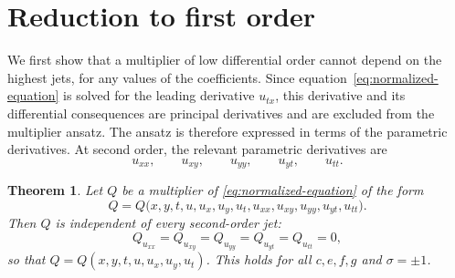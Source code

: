 \documentclass[11pt]{article}
\numberwithin{equation}{section}
\newtheorem{theorem}{Theorem}[section]
\theoremstyle{definition}
\theoremstyle{remark}
\begin{document}
\section{Reduction to first order}
\label{sec:order-reduction}

We first show that a multiplier of low differential order cannot
depend on the highest jets, for any values of the coefficients.
Since equation~\eqref{eq:normalized-equation} is solved for the
leading derivative $u_{tx}$, this derivative and its differential
consequences are principal derivatives and are excluded from the
multiplier ansatz. The ansatz is therefore expressed in terms of the
parametric derivatives. At second order, the relevant parametric
derivatives are
\[
u_{xx},
\qquad
u_{xy},
\qquad
u_{yy},
\qquad
u_{yt},
\qquad
u_{tt}.
\]

\begin{theorem}
\label{thm:order-reduction}
Let $Q$ be a multiplier of \eqref{eq:normalized-equation} of the form
\begin{equation}
Q = Q\bigl(x,y,t,u,u_x,u_y,u_t,
u_{xx},u_{xy},u_{yy},u_{yt},u_{tt}\bigr).
\label{eq:second-order-ansatz}
\end{equation}
Then $Q$ is independent of every second-order jet:
\begin{equation}
Q_{u_{xx}} = Q_{u_{xy}} = Q_{u_{yy}}
= Q_{u_{yt}} = Q_{u_{tt}} = 0,
\label{eq:no-second-order}
\end{equation}
so that $Q = Q(x,y,t,u,u_x,u_y,u_t)$. This holds for all
$c,e,f,g$ and $\sigma=\pm1$.
\end{theorem}
\end{document}
